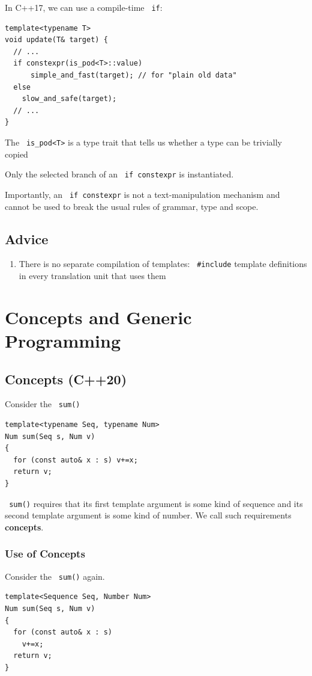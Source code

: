 \documentclass[11pt]{article}
\let\OldTexttt\texttt
\renewcommand{\texttt}[1]{\OldTexttt{\color{MidnightBlue} #1}}
\begin{document}
In C++17, we can use a compile-time \texttt{if}:
\begin{verbatim}
template<typename T>
void update(T& target) {
  // ...
  if constexpr(is_pod<T>::value)
      simple_and_fast(target); // for "plain old data"
  else
    slow_and_safe(target);
  // ...
}
\end{verbatim}
The \texttt{is\_pod<T>} is a type trait that tells us whether a type can be trivially copied

Only the selected branch of an \texttt{if constexpr} is instantiated.

Importantly, an \texttt{if constexpr} is not a text-manipulation mechanism and cannot be used to break
the usual rules of grammar, type and scope.
\subsection{Advice}
\label{sec:orgc69c463}
\begin{enumerate}
\item There is no separate compilation of templates: \texttt{\#include} template definitions in every
translation unit that uses them
\end{enumerate}
\section{Concepts and Generic Programming}
\label{sec:org4964e81}
\subsection{Concepts (C++20)}
\label{sec:orgd16369c}
Consider the \texttt{sum()}
\begin{verbatim}
template<typename Seq, typename Num>
Num sum(Seq s, Num v)
{
  for (const auto& x : s) v+=x;
  return v;
}
\end{verbatim}

\texttt{sum()} requires that its first template argument is some kind of sequence and its second template
argument is some kind of number. We call such requirements \textbf{concepts}.
\subsubsection{Use of Concepts}
\label{sec:org5e09142}
Consider the \texttt{sum()} again.
\begin{verbatim}
template<Sequence Seq, Number Num>
Num sum(Seq s, Num v)
{
  for (const auto& x : s)
    v+=x;
  return v;
}
\end{verbatim}
\end{document}
